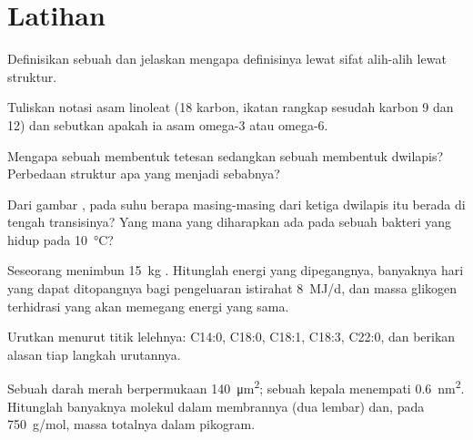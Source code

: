 \section{Latihan}

\begin{exercise}[$\star$]\label{exo:b1:lipids:1}
Definisikan sebuah  dan jelaskan mengapa definisinya lewat sifat
alih-alih lewat struktur.
\end{exercise}

\begin{exercise}[$\star$]\label{exo:b1:lipids:2}
Tuliskan notasi asam linoleat (18 karbon, ikatan rangkap sesudah karbon
9 dan 12) dan sebutkan apakah ia asam omega-3 atau omega-6.
\end{exercise}

\begin{exercise}[$\star$]\label{exo:b1:lipids:3}
Mengapa sebuah  membentuk tetesan sedangkan sebuah
 membentuk dwilapis? Perbedaan struktur apa yang menjadi
sebabnya?
\end{exercise}

\begin{exercise}[$\star$]\label{exo:b1:lipids:4}
Dari gambar , pada suhu berapa masing-masing dari ketiga
dwilapis itu berada di tengah transisinya? Yang mana yang diharapkan
ada pada sebuah bakteri yang hidup pada \qty{10}{\celsius}?
\end{exercise}

\begin{exercise}[$\star\star$]\label{exo:b1:lipids:5}
Seseorang menimbun \qty{15}{kg} . Hitunglah energi yang
dipegangnya, banyaknya hari yang dapat ditopangnya bagi pengeluaran
istirahat \qty{8}{MJ/d}, dan massa glikogen terhidrasi yang akan
memegang energi yang sama.
\end{exercise}

\begin{exercise}[$\star\star$]\label{exo:b1:lipids:6}
Urutkan menurut titik lelehnya: C14:0, C18:0, C18:1, C18:3, C22:0, dan
berikan alasan tiap langkah urutannya.
\end{exercise}

\begin{exercise}[$\star\star$]\label{exo:b1:lipids:7}
Sebuah  darah merah berpermukaan \qty{140}{\micro m^2}; sebuah kepala
 menempati \qty{0.6}{nm^2}. Hitunglah banyaknya molekul
 dalam membrannya (dua lembar) dan, pada \qty{750}{g/mol},
massa totalnya dalam pikogram.
\end{exercise}

